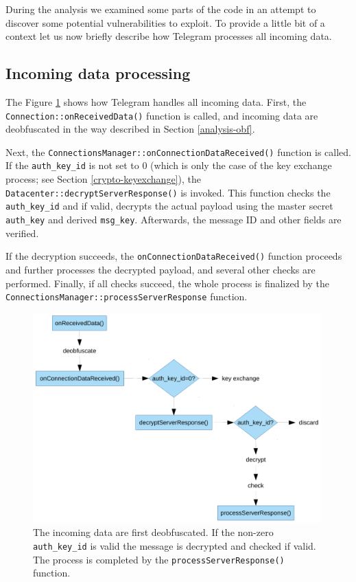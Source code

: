 \documentclass[thesis=M,english]{FITthesis}[2012/10/20]
\begin{document}
During the analysis we examined some parts of the code in an attempt to discover some potential vulnerabilities to exploit. To provide a little bit of a context let us now briefly describe how Telegram processes all incoming data.

\subsection{Incoming data processing}

The Figure \ref{img:analysis-replay-incoming} shows how Telegram handles all incoming data. First, the \texttt{Connection::onReceivedData()} function is called, and incoming data are deobfuscated in the way described in Section \ref{analysis-obf}.

Next, the \texttt{ConnectionsManager::onConnectionDataReceived()} function is called. If the \texttt{auth\_key\_id} is not set to 0 (which is only the case of the key exchange process; see Section \ref{crypto-keyexchange}), the \texttt{Datacenter::decryptServerResponse()} is invoked. This function checks the \texttt{auth\_key\_id} and if valid, decrypts the actual payload using the master secret \texttt{auth\_key} and derived \texttt{msg\_key}. Afterwards, the message ID and other fields are verified.

If the decryption succeeds, the \texttt{onConnectionDataReceived()} function proceeds and further processes the decrypted payload, and several other checks are performed. Finally, if all checks succeed, the whole process is finalized by the \texttt{ConnectionsManager::processServerResponse} function.

\begin{figure}[htb]
	\centering
	\includegraphics[width=0.99\textwidth]{incoming-flow.pdf}
	\caption[Incoming data processing]{The incoming data are first deobfuscated. If the non-zero \texttt{auth\_key\_id} is valid the message is decrypted and checked if valid. The process is completed by the \texttt{processServerResponse()} function.}
	\label{img:analysis-replay-incoming}
\end{figure}
\end{document}

